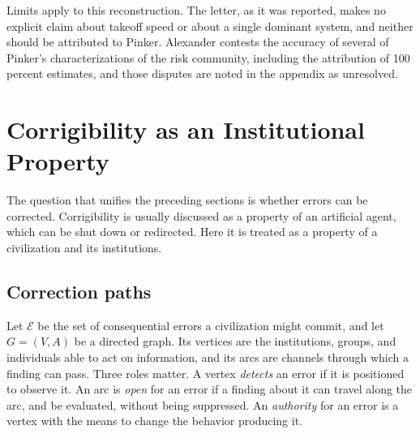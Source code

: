 \documentclass[11pt]{article}
\begin{document}
Limits apply to this reconstruction. The letter, as it was reported, makes no explicit claim about takeoff speed or about a single dominant system, and neither should be attributed to Pinker. Alexander contests the accuracy of several of Pinker's characterizations of the risk community, including the attribution of 100 percent estimates, and those disputes are noted in the appendix as unresolved.

\section{Corrigibility as an Institutional Property}\label{sec:corr}

The question that unifies the preceding sections is whether errors can be corrected. Corrigibility is usually discussed as a property of an artificial agent, which can be shut down or redirected. Here it is treated as a property of a civilization and its institutions.

\subsection{Correction paths}\label{sec:paths}

Let $\mathcal{E}$ be the set of consequential errors a civilization might commit, and let $G=(V,A)$ be a directed graph. Its vertices are the institutions, groups, and individuals able to act on information, and its arcs are channels through which a finding can pass. Three roles matter. A vertex \emph{detects} an error if it is positioned to observe it. An arc is \emph{open} for an error if a finding about it can travel along the arc, and be evaluated, without being suppressed. An \emph{authority} for an error is a vertex with the means to change the behavior producing it.
\end{document}
